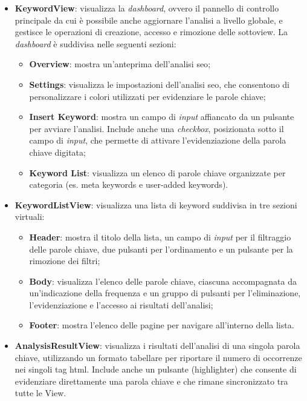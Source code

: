 \begin{itemize}
  \item \textbf{KeywordView}: visualizza la \textit{dashboard}, ovvero il pannello di controllo principale da cui è possibile anche aggiornare l’analisi a livello globale, e gestisce le operazioni di creazione, accesso e rimozione delle sottoview. La \textit{dashboard} è suddivisa nelle seguenti sezioni:
  \begin{itemize}
    \item \textbf{Overview}: mostra un’anteprima dell’analisi \gls{seo};
    \item \textbf{Settings}: visualizza le impostazioni dell’analisi \gls{seo}, che consentono di personalizzare i colori utilizzati per evidenziare le parole chiave;
    \item \textbf{Insert Keyword}: mostra un campo di \textit{input} affiancato da un pulsante per avviare l’analisi. Include anche una \textit{checkbox}, posizionata sotto il campo di \textit{input}, che permette di attivare l’evidenziazione della parola chiave digitata;
    \item \textbf{Keyword List}: visualizza un elenco di parole chiave organizzate per categoria (es. meta keywords e user-added keywords).
  \end{itemize}
  \item \textbf{KeywordListView}: visualizza una lista di keyword suddivisa in tre sezioni virtuali:
  \begin{itemize}
    \item \textbf{Header}: mostra il titolo della lista, un campo di \textit{input} per il filtraggio delle parole chiave, due pulsanti per l’ordinamento e un pulsante per la rimozione dei filtri;
    \item \textbf{Body}: visualizza l’elenco delle parole chiave, ciascuna accompagnata da un’indicazione della frequenza e un gruppo di pulsanti per l’eliminazione, l’evidenziazione e l’accesso ai risultati dell’analisi;
    \item \textbf{Footer}: mostra l’elenco delle pagine per navigare all’interno della lista.
  \end{itemize}
  \item \textbf{AnalysisResultView}: visualizza i risultati dell’analisi di una singola parola chiave, utilizzando un formato tabellare per riportare il numero di occorrenze nei singoli tag \gls{html}. Include anche un pulsante (highlighter) che consente di evidenziare direttamente una parola chiave e che rimane sincronizzato tra tutte le View.
\end{itemize}

